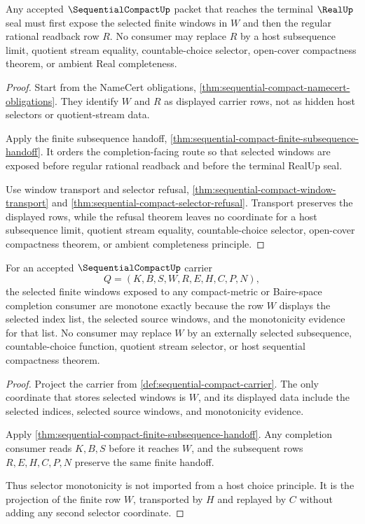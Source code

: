\begin{theorem}
\label{thm:sequential-compact-regseqrat-readback-route}
Any accepted $\SequentialCompactUp$ packet that reaches the terminal $\RealUp$ seal must first expose the selected finite windows in $W$ and then the regular rational readback row $R$. No consumer may replace $R$ by a host subsequence limit, quotient stream equality, countable-choice selector, open-cover compactness theorem, or ambient Real completeness.
\end{theorem}
\begin{proof}
Start from the NameCert obligations, \autoref{thm:sequential-compact-namecert-obligations}. They identify $W$ and $R$ as displayed carrier rows, not as hidden host selectors or quotient-stream data.

Apply the finite subsequence handoff, \autoref{thm:sequential-compact-finite-subsequence-handoff}. It orders the completion-facing route so that selected windows are exposed before regular rational readback and before the terminal RealUp seal.

Use window transport and selector refusal, \autoref{thm:sequential-compact-window-transport} and \autoref{thm:sequential-compact-selector-refusal}. Transport preserves the displayed rows, while the refusal theorem leaves no coordinate for a host subsequence limit, quotient stream equality, countable-choice selector, open-cover compactness theorem, or ambient completeness principle.
\end{proof}

\begin{theorem}
\label{thm:sequential-compact-selector-monotonicity}
For an accepted $\SequentialCompactUp$ carrier
$$
Q=(K,B,S,W,R,E,H,C,P,N),
$$
the selected finite windows exposed to any compact-metric or Baire-space completion consumer are monotone exactly because the row $W$ displays the selected index list, the selected source windows, and the monotonicity evidence for that list. No consumer may replace $W$ by an externally selected subsequence, countable-choice function, quotient stream selector, or host sequential compactness theorem.
\end{theorem}
\begin{proof}
Project the carrier from \autoref{def:sequential-compact-carrier}. The only coordinate that stores selected windows is $W$, and its displayed data include the selected indices, selected source windows, and monotonicity evidence.

Apply \autoref{thm:sequential-compact-finite-subsequence-handoff}. Any completion consumer reads $K,B,S$ before it reaches $W$, and the subsequent rows $R,E,H,C,P,N$ preserve the same finite handoff.

Thus selector monotonicity is not imported from a host choice principle. It is the projection of the finite row $W$, transported by $H$ and replayed by $C$ without adding any second selector coordinate.
\end{proof}

